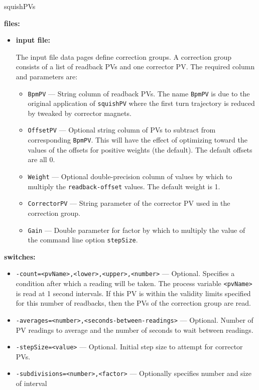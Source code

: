\begin{sddsprog}{squishPVs}
\item \textbf{files:}
\begin{itemize}
  \item \textbf{input file:}\par
The input file data pages define correction groups. A correction group
consists of a list of readback PVs and one corrector PV. The required column and parameters are:
  \begin{itemize}
    \item {\tt BpmPV} --- String column of readback PVs. The name \verb+BpmPV+ is due
                to the original application of \verb+squishPV+ where the first turn
                trajectory is reduced by tweaked by corrector magnets.
    \item {\tt OffsetPV} --- Optional string column of PVs to subtract from corresponding \verb+BpmPV+.
                This will have the effect of optimizing toward the values of the offsets for
                positive weights (the default).  The default offsets are all 0.
    \item {\tt Weight} --- Optional double-precision column of values by which to multiply the
                \verb+readback-offset+ values.  The default weight is 1.
    \item {\tt CorrectorPV} --- String parameter of the corrector PV used in the correction group.
    \item {\tt Gain} --- Double parameter for factor by which to multiply the
                value of the command line option \verb+stepSize+.
  \end{itemize}
\end{itemize}
\item \textbf{switches:}
\begin{itemize}
  \item {\tt -count=<pvName>,<lower>,<upper>,<number>} --- Optional. Specifies
                a condition after which a reading will be taken. The process variable
                \verb+<pvName>+ is read at 1 second intervals. If this
                PV is within the validity limits specified for this number of readbacks, then
                the PVs of the correction group are read.
  \item {\tt -averages=<number>,<seconds-between-readings>} --- Optional. Number of PV readings to average
                and the number of seconds to wait between readings.
  \item {\tt -stepSize=<value>} --- Optional. Initial step size to attempt for corrector PVs.
  \item {\tt -subdivisions=<number>,<factor>} --- Optionally specifies number and size of interval

\end{itemize}
\end{sddsprog}
